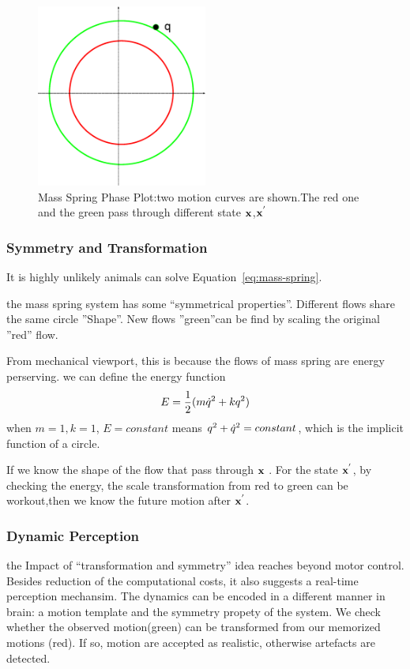\begin{figure}[!htbp]
\label{fig:massSpringPhasePlot}  
  \begin{center}
     \includegraphics[width=0.5\textwidth]{MassSpringPhasePlot}
    \caption{Mass Spring Phase Plot:two motion curves are shown.The red one and the green pass through different state $\mathbf{x}$,$\mathbf{x}^{'}$}
  \end{center}
\end{figure}

\subsubsection*{Symmetry and Transformation}
It is highly unlikely animals can solve Equation~\ref{eq:mass-spring}.

the mass spring system has some ``symmetrical properties''.
Different flows share the same circle ''Shape''.
New flows ''green''can be find by scaling the original ''red'' flow.

From mechanical viewport, this is because the flows of mass spring are energy perserving.
we can define the energy function
\[
E=\frac{1}{2}(m\dot{q}^2+kq^2)
\]
when $m=1,k=1$, $E=constant$ means $q^2+\dot{q}^2=constant$, which is the implicit function of a circle.

If we know the shape of the flow that pass through  $\mathbf{x}$ .
For the state $\mathbf{x}^{'}$, by checking the energy, the scale transformation from red to green can be workout,then we know the future motion after $\mathbf{x}^{'}$.


\subsubsection*{Dynamic Perception}
the Impact of ``transformation and symmetry'' idea reaches beyond motor control. 
Besides reduction of the computational costs, it also suggests a real-time perception mechansim.
The dynamics can be encoded in a different manner in brain: a motion template and the symmetry propety of the system.
We check whether the observed motion(green) can be transformed from our memorized motions (red).
If so, motion are accepted as realistic, otherwise artefacts are detected.


